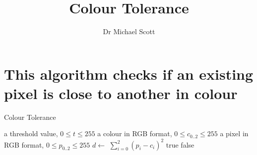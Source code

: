 \documentclass{../../../fal_assignment}
\title{Colour Tolerance}
\author{Dr Michael Scott}
\begin{document}
\maketitle

	\section{This algorithm checks if an existing pixel is close to another in colour}
	\begin{algorithm}[ht]
	\caption{Colour Tolerance}
	\label{alg:algorithm}
	
	\begin{algorithmic}[1]
		\Require
		\Statex a threshold value,  $0 \leq t \leq 255$
		\Statex a colour in RGB format,  $0 \leq c_{0..2} \leq 255$
		\Statex a pixel in RGB format,  $0 \leq p_{0..2} \leq 255$
		\State $d \leftarrow$ $\sum_{i=0}^{2} ( p_i - c_i) ^2$
		\State \Return true
		\Else
		\State \Return false
		\EndIf
		\EndFunction
	\end{algorithmic}
	
\end{algorithm}
\end{document}
